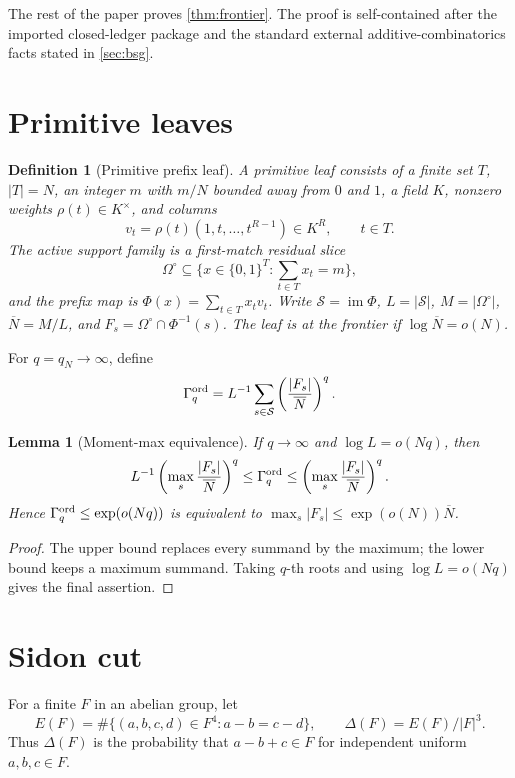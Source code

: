 \documentclass[11pt,a4paper]{amsart}
\numberwithin{equation}{section}
\newtheorem{lemma}[theorem]{Lemma}
\newtheorem{definition}[theorem]{Definition}
\theoremstyle{remark}
\newcommand{\Scal}{\mathcal S}
\newcommand{\OmegaC}{\Omega^{\circ}}
\newcommand{\Gord}{\Gamma^{\rm ord}}
\newcommand{\barN}{\overline N}
\begin{document}
The rest of the paper proves \cref{thm:frontier}.  The proof is self-contained after the imported closed-ledger package and the standard external additive-combinatorics facts stated in \cref{sec:bsg}.

\section{Primitive leaves}

\begin{definition}[Primitive prefix leaf]\label{def:primitive-leaf}
A primitive leaf consists of a finite set \(T\), \(|T|=N\), an integer \(m\) with \(m/N\) bounded away from \(0\) and \(1\), a field \(K\), nonzero weights \(\rho(t)\in K^\times\), and columns
\[
        v_t=\rho(t)(1,t,\ldots,t^{R-1})\in K^R,\qquad t\in T.
\]
The active support family is a first-match residual slice
\[
        \OmegaC\subseteq \{x\in\{0,1\}^{T}:\sum_{t\in T}x_t=m\},
\]
and the prefix map is \(\Phi(x)=\sum_{t\in T}x_tv_t\).  Write \(\Scal=\operatorname{im}\Phi\), \(L=|\Scal|\), \(M=|\OmegaC|\), \(\barN=M/L\), and \(F_s=\OmegaC\cap\Phi^{-1}(s)\).  The leaf is at the frontier if \(\log\barN=o(N)\).
\end{definition}

For \(q=q_N\to\infty\), define
\[
        \Gord_q=L^{-1}\sum_{s\in\Scal}\left(\frac{|F_s|}{\barN}\right)^q .
\]

\begin{lemma}[Moment-max equivalence]\label{lem:moment-max}
If \(q\to\infty\) and \(\log L=o(Nq)\), then
\[
        L^{-1}\left(\max_s\frac{|F_s|}{\barN}\right)^q
        \le \Gord_q
        \le
        \left(\max_s\frac{|F_s|}{\barN}\right)^q .
\]
Hence \(\Gord_q\le \exp(o(Nq))\) is equivalent to \(\max_s|F_s|\le\exp(o(N))\barN\).
\end{lemma}

\begin{proof}
The upper bound replaces every summand by the maximum; the lower bound keeps a maximum summand.  Taking \(q\)-th roots and using \(\log L=o(Nq)\) gives the final assertion.
\end{proof}

\section{Sidon cut}

For a finite \(F\) in an abelian group, let
\[
        E(F)=\#\{(a,b,c,d)\in F^4:a-b=c-d\},\qquad
        \Delta(F)=E(F)/|F|^3.
\]
Thus \(\Delta(F)\) is the probability that \(a-b+c\in F\) for independent uniform \(a,b,c\in F\).
\end{document}
